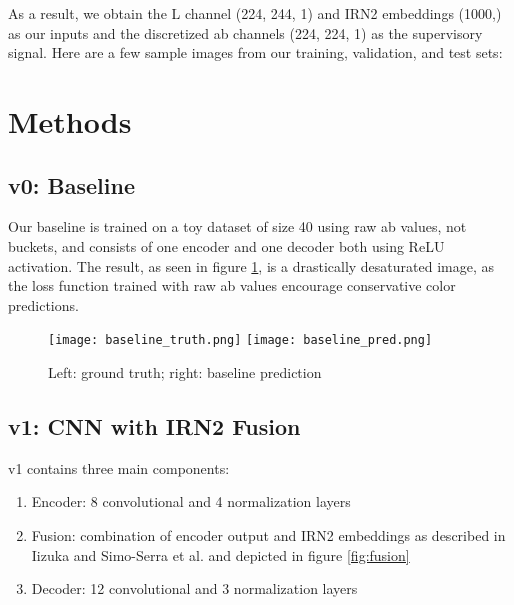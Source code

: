 \documentclass{article} %
\begin{document}
As a result, we obtain the L channel (224, 244, 1) and IRN2 embeddings (1000,) as our inputs and the discretized ab channels (224, 224, 1) as the supervisory signal. Here are a few sample images from our training, validation, and test sets:\\


\section{Methods}

\subsection{v0: Baseline}

Our baseline is trained on a toy dataset of size 40 using raw ab values, not buckets, and consists of one encoder and one decoder both using ReLU activation. The result, as seen in figure \ref{fig:baseline}, is a drastically desaturated image, as the loss function trained with raw ab values encourage conservative color predictions.

\begin{figure}[h]
    \centering
        \texttt{[image: baseline\_truth.png]}
        \texttt{[image: baseline\_pred.png]}
    \caption{Left: ground truth; right: baseline prediction}
    \label{fig:baseline}
\end{figure}

\subsection{v1: CNN with IRN2 Fusion}

v1 contains three main components:

\begin{enumerate}
    \item Encoder: 8 convolutional and 4 normalization layers
    \item Fusion: combination of encoder output and IRN2 embeddings as described in Iizuka and Simo-Serra et al.\cite{fusion} and depicted in figure \ref{fig:fusion}
    \item Decoder: 12 convolutional and 3 normalization layers
\end{enumerate}
\end{document}
